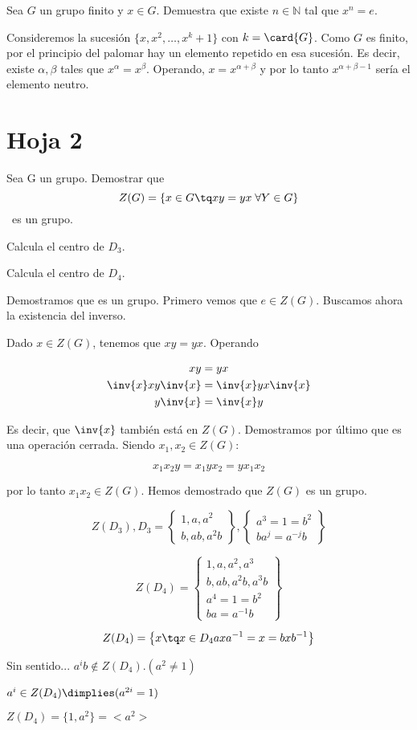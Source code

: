 \documentclass[nochap]{apuntes}
\begin{document}
\begin{problem}[14] Sea $G$ un grupo finito y $x∈G$. Demuestra que existe $n∈ℕ$ tal que $x^n = e$.
\solution

Consideremos la sucesión $\{x,x^2,\dotsc,x^k+1\}$ con $k=\card{G}$. Como $G$ es finito, por el principio del palomar hay un elemento repetido en esa sucesión. Es decir, existe $α,β$ tales que $x^α=x^β$. Operando, $x = x^{α+β}$ y por lo tanto $x^{α+β-1}$ sería el elemento neutro.
\end{problem}

\section{Hoja 2}
\begin{problem}[4]
Sea G un grupo. Demostrar que \[ Z(G) = \{x \in G \tq xy = yx\; \forall Y \in G\} \] es un grupo. 

\ppart Calcula el centro de $D_3$.

\ppart Calcula el centro de $D_4$.

\solution

Demostramos que es un grupo. Primero vemos que $e \in Z(G)$. Buscamos ahora la existencia del inverso.

Dado $x∈Z(G)$, tenemos que $xy = yx$. Operando 

\begin{align*}
xy &= yx \\
\inv{x}xy\inv{x} &= \inv{x}yx\inv{x} \\
y \inv{x} &= \inv{x} y
\end{align*}

Es decir, que $\inv{x}$ también está en $Z(G)$. Demostramos por último que es una operación cerrada. Siendo $x_1,x_2∈Z(G)$:

\[ x_1 x_2 y = x_1 y x_2 = y x_1 x_2 \]

por lo tanto $x_1x_2 ∈ Z(G)$. Hemos demostrado que $Z(G)$ es un grupo.

\spart
$$Z(D_3), D_3 = \left\{\begin{matrix} 1,a,a^2\\b,ab,a^2b\end{matrix}\right\},\left\{\begin{matrix}a^3 = 1 = b^2\\ ba^j = a^{-j}b\end{matrix}\right\}$$

\spart 
$$Z(D_4) =\left\{\begin{matrix} 1,a,a^2,a^3\\b,ab,a^2b,a^3b\\a^4=1=b^2\\ba=a^{-1}b\end{matrix}\right\}$$

$$Z(D_4) = \left\{x \tq x\in D_4 axa^{-1} = x = bxb^{-1}\right\}$$

Sin sentido...
$a^ib \notin Z(D_4). (a^2 \neq 1)$

$a^i \in Z(D_4) \dimplies (a^{2i} = 1)$

$Z(D_4) = \{1,a^2\} = <a^2>$
\end{problem}
\end{document}
